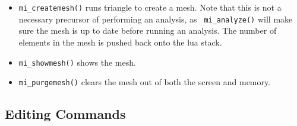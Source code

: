 \begin{itemize}
\item{\tt mi\_createmesh()} runs triangle to create a mesh. Note that this is not a
necessary precursor of performing an analysis, as {\tt
mi\_analyze()} will make sure the mesh is up to date before running
an analysis. The number of elements in the mesh is pushed back onto
the lua stack.

\item{\tt mi\_showmesh()} shows the mesh.

\item{\tt mi\_purgemesh()} clears the mesh out of both the screen and
memory.
\end{itemize}

\subsection{Editing Commands}

